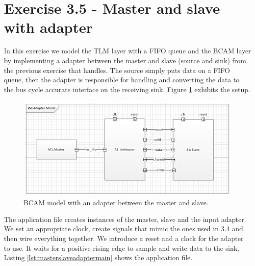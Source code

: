 \section{Exercise 3.5 - Master and slave with adapter}

In this exercise we model the TLM layer with a FIFO queue and the BCAM layer by implementing a adapter between the master and slave (source and sink) from the previous exercise that handles. The source simply puts data on a FIFO queue, then the adapter is responsible for handling and converting the data to the bus cycle accurate interface on the receiving sink. Figure \ref{fig:masterslaveadapter} exhibits the setup.

\begin{figure}[h]
	\centering
	\includegraphics[width=1\linewidth]{MasterSlaveAdapter.png}
	\caption{BCAM model with an adapter between the master and slave.}
	\label{fig:masterslaveadapter}
\end{figure}
\newpage
\noindent The application file creates instances of the master, slave and the input adapter. We set an appropriate clock, create signals that mimic the ones used in 3.4 and then wire everything together. We introduce a reset and a clock for the adapter to use. It waits for a positive rising edge to sample and write data to the sink. Listing \ref{lst:masterslaveadaptermain} shows the application file.
